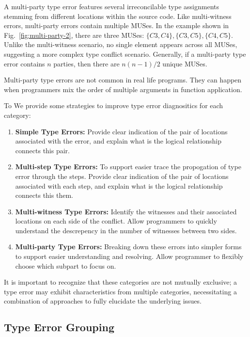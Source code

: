 \documentclass[pdflatex,sn-nature,Numbered]{sn-jnl}%
\begin{document}
  A multi-party type error features several irreconcilable type assignments stemming from different locations within the source code. Like multi-witness errors, multi-party errors contain multiple MUSes. In the example shown in Fig.~\ref{fig:multi-party-2}, there are three MUSes: $\{C3, C4\}, \{C3, C5\}, \{C4, C5\}$. Unlike the multi-witness scenario, no single element appears across all MUSes, suggesting a more complex type conflict scenario. Generally, if a multi-party type error contains $n$ parties, then there are $n (n - 1) / 2$ unique MUSes.

Multi-party type errors are not common in real life programs. They can happen when programmers mix the order of multiple arguments in function application.  
  
To We provide some strategies to improve type error diagnositics for each category:

\begin{enumerate}
  \item {
    \textbf{Simple Type Errors:}  Provide clear indication of the pair of locations associated with the error, and explain what is the logical relationship connects this pair.
  }
  
  \item {
    \textbf{Multi-step Type Errors:} To support easier trace the propogation of type error through the steps. Provide clear indication of the pair of locations associated with each step, and explain what is the logical relationship connects this them.
  }
  \item {
    \textbf{Multi-witness Type Errors:} Identify the witnesses and their associated locations on each side of the conflict. Allow programmers to quickly understand the descrepency in the number of witnesses between two sides.
  }
  \item {
    \textbf{Multi-party Type Errors:} Breaking down these errors into simpler forms to support easier understanding and resolving. Allow programmer to flexibly choose which subpart to focus on.
  }
\end{enumerate}

It is important to recognize that these categories are not mutually exclusive; a type error may exhibit characteristics from multiple categories, necessitating a combination of approaches to fully elucidate the underlying issues.

\subsection{Type Error Grouping} \label{sub:grouping}
\end{document}
